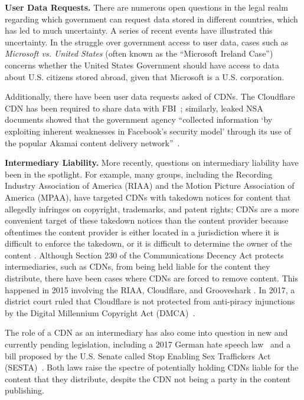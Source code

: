 \textbf{User Data Requests.}
There are numerous open questions in the legal realm regarding which government can request data stored in different countries, which 
has led to much uncertainty.  A series of recent events have illustrated this uncertainty.  In the struggle over government access to 
user data, cases such as {\it Microsoft vs. United States} (often known as the ``Microsoft Ireland Case'') concerns whether the United 
States Government should have access to data about U.S. citizens stored abroad, given that Microsoft is a U.S. corporation.  

Additionally, there have been user data requests asked of CDNs.  The Cloudflare CDN has been required
to share data with FBI~\cite{cloudflare_nsl}; similarly, leaked NSA documents showed
that the government agency ``collected information `by exploiting inherent 
weaknesses in Facebook's security model' through its use of the popular Akamai content
delivery network''~\cite{facebook_surv}.

\textbf{Intermediary Liability.}
More recently, questions on intermediary liability have been in the spotlight.  For example, many groups, including the Recording Industry 
Association of America (RIAA) and the Motion Picture Association of America (MPAA), have targeted CDNs with takedown notices for 
content that allegedly infringes on copyright, trademarks, and patent rights; CDNs are a more convenient target of these takedown notices than 
the content provider because oftentimes the content provider is either located in a jurisdiction where it is difficult to enforce the takedown, 
or it is difficult to determine the owner of the content \cite{medium_copyright,eff_copyright}.
Although Section 230 of the Communications Decency Act protects intermediaries,
such as CDNs, from being held
liable for the content they distribute, there have been cases where CDNs are forced
to remove content.  This happened in 2015 involving the RIAA, Cloudflare, and Grooveshark \cite{techdirt_copyright}. In 2017, a district court ruled that Cloudflare is not protected from anti-piracy injunctions by the Digital Millennium Copyright Act (DMCA)~\cite{stack_copyright}.

The role of a CDN as an intermediary has also come into question in new and currently
pending legislation, including a 2017 German hate speech law~\cite{nytimes_hatespeech} and a bill proposed by the U.S. Senate called Stop Enabling Sex Traffickers Act (SESTA)~\cite{medium_sesta}. Both laws raise the spectre of potentially holding CDNs liable for the content that they distribute, despite the CDN not being a party in the content publishing.

